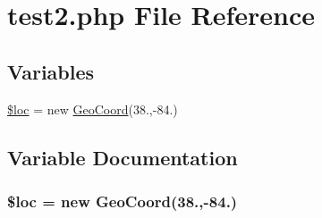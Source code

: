 \hypertarget{test2_8php}{}\section{test2.\+php File Reference}
\label{test2_8php}
\subsection*{Variables}
\begin{DoxyCompactItemize}
\item 
\hyperlink{test2_8php_a5b64ac9a38b866d891fcb47ca45c0b3d}{\$loc} = new \hyperlink{class_geo_coord}{Geo\+Coord}(38.,-\/84.)
\end{DoxyCompactItemize}


\subsection{Variable Documentation}
\subsubsection[{\texorpdfstring{\$loc}{$loc}}]{\setlength{\rightskip}{0pt plus 5cm}\$loc = new {\bf Geo\+Coord}(38.,-\/84.)}\hypertarget{test2_8php_a5b64ac9a38b866d891fcb47ca45c0b3d}{}\label{test2_8php_a5b64ac9a38b866d891fcb47ca45c0b3d}
